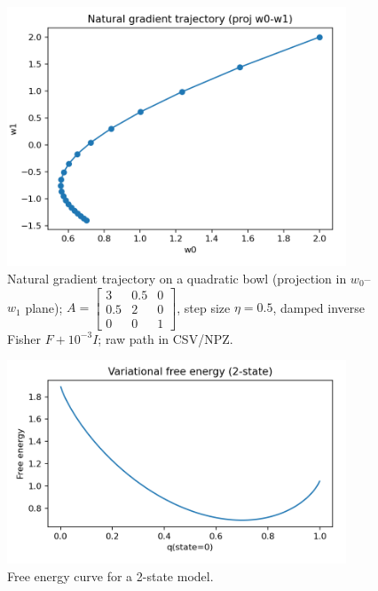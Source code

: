 \documentclass[
  10pt,
]{article}
\begin{document}
\begin{figure}[htbp]
\centering
\includegraphics[width=0.9\textwidth]{figures/natural_gradient_path.png}
\caption{Natural gradient trajectory on a quadratic bowl (projection in $w_0$–$w_1$ plane); $A=\begin{bmatrix}3 & 0.5 & 0\\ 0.5 & 2 & 0\\ 0 & 0 & 1\end{bmatrix}$, step size $\eta=0.5$, damped inverse Fisher $F + 10^{-3} I$; raw path in CSV/NPZ.}
\label{fig:natural_gradient_path}
\end{figure}

\begin{figure}[htbp]
\centering
\includegraphics[width=0.9\textwidth]{figures/free_energy_curve.png}
\caption{Free energy curve for a 2-state model.}
\label{fig:free_energy_curve}
\end{figure}
\end{document}
